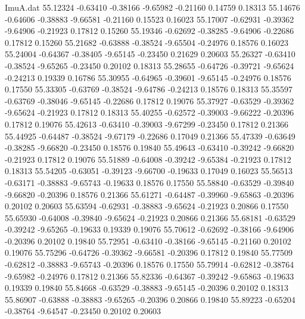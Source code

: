 \begin{filecontents}{ImuA.dat}
  55.12324   -0.63410   -0.38166   -9.65982   -0.21160    0.14759    0.18313
  55.14676   -0.64606   -0.38883   -9.66581   -0.21160    0.15523    0.16023
  55.17007   -0.62931   -0.39362   -9.64906   -0.21923    0.17812    0.15260
  55.19346   -0.62692   -0.38285   -9.64906   -0.22686    0.17812    0.15260
  55.21682   -0.63888   -0.38524   -9.65504   -0.24976    0.18576    0.16023
  55.24004   -0.64367   -0.38405   -9.65145   -0.23450    0.21629    0.20603
  55.26327   -0.63410   -0.38524   -9.65265   -0.23450    0.20102    0.18313
  55.28655   -0.64726   -0.39721   -9.65624   -0.24213    0.19339    0.16786
  55.30955   -0.64965   -0.39601   -9.65145   -0.24976    0.18576    0.17550
  55.33305   -0.63769   -0.38524   -9.64786   -0.24213    0.18576    0.18313
  55.35597   -0.63769   -0.38046   -9.65145   -0.22686    0.17812    0.19076
  55.37927   -0.63529   -0.39362   -9.65624   -0.21923    0.17812    0.18313
  55.40255   -0.62572   -0.39003   -9.66222   -0.20396    0.17812    0.19076
  55.42613   -0.63410   -0.39003   -9.67299   -0.23450    0.17812    0.21366
  55.44925   -0.64487   -0.38524   -9.67179   -0.22686    0.17049    0.21366
  55.47339   -0.63649   -0.38285   -9.66820   -0.23450    0.18576    0.19840
  55.49643   -0.63410   -0.39242   -9.66820   -0.21923    0.17812    0.19076
  55.51889   -0.64008   -0.39242   -9.65384   -0.21923    0.17812    0.18313
  55.54205   -0.63051   -0.39123   -9.66700   -0.19633    0.17049    0.16023
  55.56513   -0.63171   -0.38883   -9.65743   -0.19633    0.18576    0.17550
  55.58840   -0.63529   -0.39840   -9.66820   -0.20396    0.18576    0.21366
  55.61271   -0.64487   -0.39960   -9.65863   -0.20396    0.20102    0.20603
  55.63594   -0.62931   -0.38883   -9.65624   -0.21923    0.20866    0.17550
  55.65930   -0.64008   -0.39840   -9.65624   -0.21923    0.20866    0.21366
  55.68181   -0.63529   -0.39242   -9.65265   -0.19633    0.19339    0.19076
  55.70612   -0.62692   -0.38166   -9.64906   -0.20396    0.20102    0.19840
  55.72951   -0.63410   -0.38166   -9.65145   -0.21160    0.20102    0.19076
  55.75296   -0.64726   -0.39362   -9.66581   -0.20396    0.17812    0.19840
  55.77509   -0.62812   -0.38883   -9.65743   -0.20396    0.18576    0.17550
  55.79914   -0.62812   -0.38764   -9.65982   -0.24976    0.17812    0.21366
  55.82336   -0.64367   -0.39242   -9.65863   -0.19633    0.19339    0.19840
  55.84668   -0.63529   -0.38883   -9.65145   -0.20396    0.20102    0.18313
  55.86907   -0.63888   -0.38883   -9.65265   -0.20396    0.20866    0.19840
  55.89223   -0.65204   -0.38764   -9.64547   -0.23450    0.20102    0.20603

\end{filecontents}

